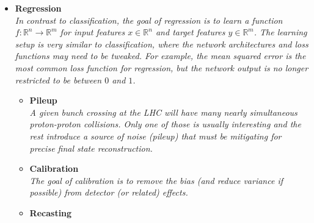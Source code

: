 \documentclass[12pt,letterpaper]{article}
\begin{document}
\begin{itemize}
\begin{itemize}
\begin{itemize}
			\end{itemize}
	\end{itemize}
\item \textbf{Regression}
\\\textit{In contrast to classification, the goal of regression is to learn a function $f:\mathbb{R}^n\rightarrow\mathbb{R}^m$ for input features $x\in\mathbb{R}^n$ and target features $y\in\mathbb{R}^m$.  The learning setup is very similar to classification, where the network architectures and loss functions may need to be tweaked.  For example, the mean squared error is the most common loss function for regression, but the network output is no longer restricted to be between $0$ and $1$.}
	\begin{itemize}
		\item \textbf{Pileup}~\cite{Dimitrova:2025mbl,Vaughan:2025ijq,Algren:2024bqw,Lieret:2023aqg,Kim:2023koz,CRESST:2022qor,Li:2022omf,Maier:2021ymx,Carrazza:2019efs,Martinez:2018fwc,ATL-PHYS-PUB-2019-028,Komiske:2017ubm}
		\\\textit{A given bunch crossing at the LHC will have many nearly simultaneous proton-proton collisions.  Only one of those is usually interesting and the rest introduce a source of noise (pileup) that must be mitigating for precise final state reconstruction.}
		\item \textbf{Calibration}~\cite{Halabi:2025kff,Mishra:2025fnk,Kladov:2025cul,Dimitrova:2025wfu,MODE:2025ekn,DeVita:2025zlf,Borysova:2024pok,ATLAS:2024rpl,CMS:2024jdl,Akchurin:2024ffj,Britton:2024pdy,Hashmani:2024ykk,Zdybal:2024yzu,Kocot:2023izs,Acosta:2023nuw,Bein:2023ylt,Holmberg:2023rfr,Meyer:2023ffd,ALICETPC:2023ojd,ATLAS:2023tyv,Khozani:2023bql,Raine:2023fko,Soleymaninia:2023dds,Grosso:2023ltd,Grosso:2023jxp,Basak:2023wzq,Schwenker:2023bih,Lee:2023jew,Aad:2023ula,Guglielmi:2022ftj,Ge:2022xrv,Darulis:2022brn,Leigh:2022lpn,Valsecchi:2022rla,Gambhir:2022dut,Gambhir:2022gua,Akchurin:2022apq,Qiu:2022xvr,Alves:2022gnw,Dorigo:2022tfi,Chadeeva:2022kay,Pata:2022wam,Renteria-Estrada:2021zrd,Kronheim:2021hdb,Arratia:2021tsq,Micallef:2021src,Polson:2021kvr,Diefenthaler:2021rdj,Akchurin:2021ahx,Kieseler:2020wcq,Akchurin:2021afn,Pollard:2021fqv,Kieseler:2021jxc,Du:2020pmp,Baldi:2020hjm,Sirunyan:2019wwa,Kasieczka:2020vlh,Hooberman:DLPS2017,ATL-PHYS-PUB-2018-013,ATL-PHYS-PUB-2020-001,Cheong:2019upg}
		\\\textit{The goal of calibration is to remove the bias (and reduce variance if possible) from detector (or related) effects.}
		\item \textbf{Recasting}~\cite{Nachman:2025fdd,Corpe:2025sbw,Goodsell:2024aig,Hammad:2022wpq,1806026,Bertone:2016mdy,Caron:2017hku}

\end{itemize}
\end{itemize}
\end{document}
